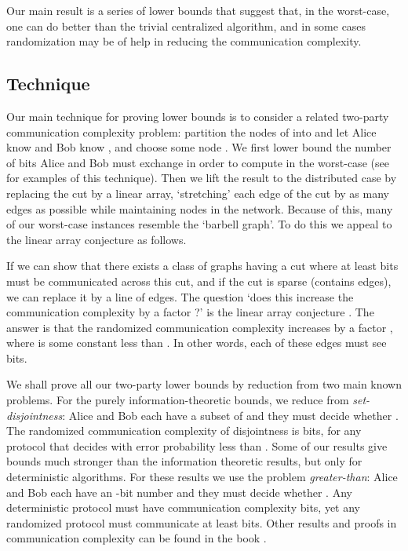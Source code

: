 \documentclass[twocolumn]{article}
\begin{document}
Our main result is a series of lower bounds that suggest that, in the worst-case, one can do better than the trivial centralized algorithm, and in some cases randomization may be of help in reducing the communication complexity.

\subsection{Technique}
\label{sec:technique}

Our main technique for proving lower bounds is to consider a related two-party
communication complexity problem: partition the nodes of  into  and let Alice know  and Bob know , and choose some node . We first lower bound the number of bits Alice and Bob must exchange in order to compute  in the worst-case (see \cite{nisan97communication} for examples of this technique). Then we lift the result to the distributed case by replacing the cut  by a linear array, `stretching' each edge of the cut by as many edges as possible while maintaining  nodes in the network. Because of this, many of our worst-case instances resemble the `barbell graph'. To do this we appeal to the linear array conjecture \cite{237817,258622} as follows.

If we can show that there exists a class of graphs having a cut where at least  bits must be communicated across this cut, and if the cut is sparse (contains  edges), we can replace it by a line of  edges. The question `does this increase the communication complexity by a factor ?' is the linear array conjecture \cite{237817}. The answer is that the randomized communication complexity increases by a factor , where  is some constant less than . In other words, each of these edges must see  bits.

We shall prove all our two-party lower bounds by reduction from two main known problems. For the purely information-theoretic bounds, we reduce from {\em set-disjointness}: Alice and Bob each have a subset  of  and they must decide whether . The randomized communication complexity of disjointness is  bits, for any protocol that decides with error probability less than . Some of our results give bounds much stronger than the information theoretic results, but only for deterministic algorithms. For these results we use the problem {\em greater-than}: Alice and Bob each have an -bit number  and they must decide whether . Any deterministic protocol must have communication complexity  bits, yet any randomized protocol must communicate at least  bits. Other results and proofs in communication complexity can be found in the book \cite{nisan97communication}.
\end{document}
